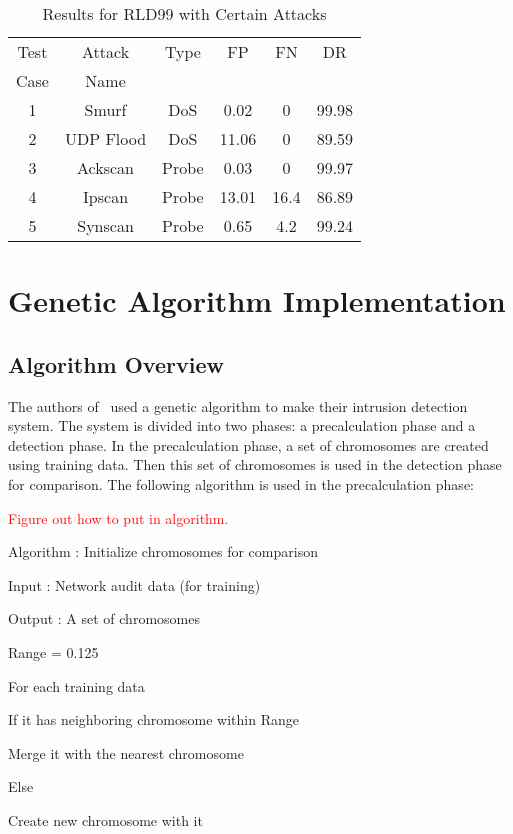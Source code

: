 \documentclass{sig-alternate}
\newcommand{\mycomment}[1]{\textcolor{red}{#1}}
\begin{document}
\begin{table}
\caption{Results for RLD99 with Certain Attacks}
\begin{tabular}{|cccccc|} \hline
Test & Attack & Type & FP & FN & DR\\
Case & Name   &&&&\\ \hline
1 & Smurf & DoS & 0.02 & 0 & 99.98\\
2 & UDP Flood & DoS & 11.06 & 0 & 89.59\\
3 & Ackscan & Probe & 0.03 & 0 & 99.97\\
4 & Ipscan & Probe & 13.01 & 16.4 & 86.89\\
5 & Synscan & Probe & 0.65 & 4.2 & 99.24\\
\hline\end{tabular}
\label{tab:rldAttacks}
\end{table}




\section{Genetic Algorithm Implementation}

\subsection{Algorithm Overview}
The authors of~\cite{DBLP:journals/corr/abs-1204-1336} used a genetic algorithm to make their intrusion detection system. The system is divided into two phases: a precalculation phase and a detection phase. In the precalculation phase, a set of chromosomes are created using training data. Then this set of chromosomes is used in the detection phase for comparison. The following algorithm is used in the precalculation phase:

\mycomment{Figure out how to put in algorithm.}

Algorithm : Initialize chromosomes for comparison

Input : Network audit data (for training)

Output : A set of chromosomes

Range = 0.125

For each training data

   If it has neighboring chromosome within Range

      Merge it with the nearest chromosome

   Else

      Create new chromosome with it
\end{document}
